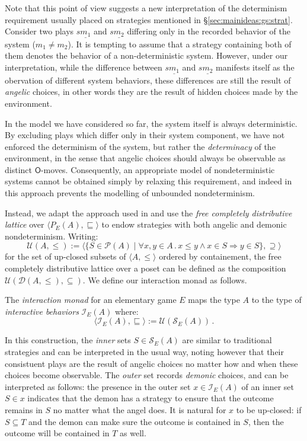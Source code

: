 \documentclass[format=sigplan,authordraft]{acmart}
\newcommand{\kw}[1]{\ensuremath{\mathsf{#1}}}
\begin{document}
Note that this point of view suggests a new interpretation
of the determinism requirement usually placed on strategies
mentioned in \S\ref{sec:mainideas:gs:strat}.
Consider
two plays $s\underline{m_1}$ and $s\underline{m_2}$
differing only in the recorded behavior of the system
($m_1 \neq m_2$).
It is tempting to assume that
a strategy containing both of them
denotes the behavior of a non-deterministic system.
However,
under our interpretation,
while the difference between $s\underline{m_1}$ and $s\underline{m_2}$
manifests itself as the obervation of different system behaviors,
these differences are still the result of \emph{angelic} choices,
in other words they are the result of hidden choices made by the
environment.

In the model we have considered so far,
the system itself is always deterministic.
By excluding plays which differ only in their system component,
we have not enforced the determinism of the system,
but rather the \emph{determinacy} of the environment,
in the sense that angelic choices should always be observable
as distinct \kw{O}-moves.
Consequently,
an appropriate model of nondeterministic systems
cannot be obtained simply by relaxing this requirement,
and indeed in \cite{gsfnd} this approach
prevents the modelling of unbounded nondeterminism.

Instead,
we adapt the approach used in \cite{augtyp}
and use the \emph{free completely distributive lattice}
over $\langle P_E(A), {\sqsubseteq} \rangle$
to endow strategies with both angelic and demonic nondeterminism.
Writing:
\[
  \mathcal{U}(A, {\le}) :=
    \langle
    \{ S \in \mathcal{P}(A) \mid
        \forall x, y \in A \,.\,
           x \le y \wedge x \in S \Rightarrow y \in S \},
    {\supseteq}
    \rangle
\]
for the set of up-closed subsets of $\langle A, {\le} \rangle$
ordered by containement,
the free completely distributive lattice over a poset
can be defined as the composition
$\mathcal{U}(\mathcal{D}(A, {\le}), {\subseteq})$.
We define our interaction monad as follows.

\begin{definition}
The \emph{interaction monad}
for an elementary game $E$
maps the type $A$ to the type of \emph{interactive behaviors}
$\mathcal{I}_E(A)$ where:
\[
  \langle \mathcal{I}_E(A), {\sqsubseteq} \rangle :=
    \mathcal{U}(\mathcal{S}_E(A)) \,.
\]
\end{definition}

In this construction,
the \emph{inner} sets $S \in \mathcal{S}_E(A)$
are similar to traditional strategies and
can be interpreted in the usual way,
noting however that their consistuent plays
are the result of angelic choices
no matter how and when these choices become observable.
The \emph{outer} set records \emph{demonic} choices,
and can be interpreted as follows:
the presence in the outer set $x \in \mathcal{I}_E(A)$
of an inner set $S \in x$
indicates that the demon has a strategy
to ensure that the outcome remains in $S$
no matter what the angel does.
It is natural for $x$ to be up-closed:
if $S \subseteq T$ and the demon can make sure
the outcome is contained in $S$,
then the outcome will be contained in $T$ as well.
\end{document}
